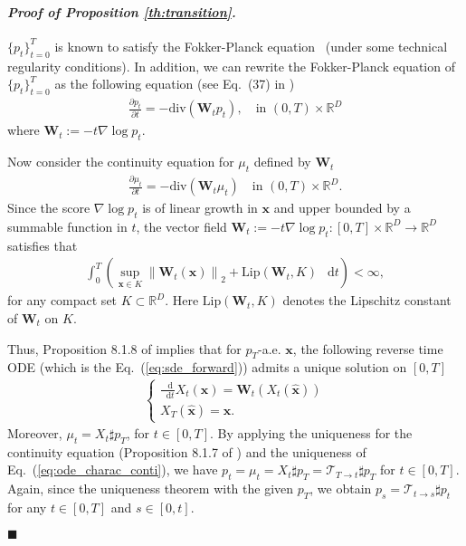 \documentclass{article} \usepackage{iclr2024_coNFErence,times}
\def\eqref#1{equation~\ref{#1}}
\newcommand{\norm}[1]{\left\lVert#1\right\rVert}
\newenvironment{myproof}[2]{\paragraph{\textit{Proof of {#1} {#2}. }}}{\hfill$\blacksquare$}
\def\eqref#1{(\ref{#1})}
\def\eqref#1{(\ref{#1})}
\theoremstyle{definition}
\theoremstyle{remark}
\newcommand*\diff{\mathop{}\!\mathrm{d}}
\begin{document}
\begin{myproof}{Proposition}{\ref{th:transition}}
    $\{p_t\}_{t=0}^{T}$ is known to satisfy the Fokker-Planck equation~\citep{oksendal2003stochastic} (under some technical regularity conditions). In addition, we can rewrite the Fokker-Planck equation of $\{p_t\}_{t=0}^{T}$ as the following equation (see Eq.~(37) in \citep{song2020score})
    \begin{align}
        \frac{\partial p_t}{\partial t} = -\text{div} \left( \mathbf{W}_t p_t \right), \quad\text{in } (0,T)\times\mathbb{R}^D
    \end{align}
    where $\mathbf{W}_t:=-t\nabla\log p_t$. 

    Now consider the continuity equation for $\mu_t$ defined by $\mathbf{W}_t$ 
    \begin{align}\label{eq:conti_eq}
        \frac{\partial \mu_t}{\partial t} = -\text{div} \left( \mathbf{W}_t \mu_t \right) \quad\text{in } (0,T)\times\mathbb{R}^D.
    \end{align}
    Since the score $\nabla\log p_t$ is of linear growth in $\mathbf{x}$ and upper bounded by a summable function in $t$, the vector field $\mathbf{W}_t:=-t\nabla \log p_t\colon[0,T]\times\mathbb{R}^D\rightarrow\mathbb{R}^D$ satisfies that 
        \begin{align*}
            \int_{0}^{T}\left( \sup_{\mathbf{x}\in K}\norm{\mathbf{W}_t(\mathbf{x})}_2+ \text{Lip}(\mathbf{W}_t,K)~\diff t \right) < \infty,
        \end{align*}
    for any compact set $K\subset\mathbb{R}^D$. Here $\text{Lip}(\mathbf{W}_t,K)$ denotes the Lipschitz constant of $\mathbf{W}_t$ on $K$.

    Thus, Proposition 8.1.8 of \citep{ambrosio2005gradient} implies that for $p_T$-a.e. $\mathbf{x}$, the following reverse time ODE (which is the Eq.~\eqref{eq:sde_forward}) admits a unique solution on $[0,T]$
    \begin{align}
        \begin{cases}\label{eq:ode_charac_conti}
        \frac{\diff }{\diff t} X_t(\mathbf{x})=  \mathbf{W}_t\left( X_t(\hat{\mathbf{x}}) \right)
        \\ X_T(\hat{\mathbf{x}})=\mathbf{x}.
        \end{cases}
    \end{align}
    Moreover, $\mu_t = X_t \sharp p_T$, for $t\in[0,T]$. By applying the uniqueness for the continuity equation (Proposition 8.1.7 of \citep{ambrosio2005gradient}) and the uniqueness of Eq.~\eqref{eq:ode_charac_conti}, we have $p_t = \mu_t = X_t \sharp p_T=\mathcal{T}_{T\rightarrow t} \sharp p_T$ for $t\in[0,T]$. Again, since the uniqueness theorem with the given $p_T$, we obtain $p_s =\mathcal{T}_{t\rightarrow s} \sharp p_t$ for any $t\in[0,T]$ and $s\in[0,t]$.
    
\end{myproof}
\end{document}
